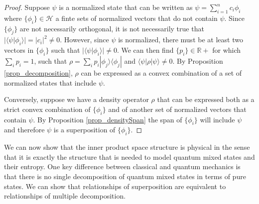 \documentclass[10pt,twocolumn, nofootinbib]{revtex4-2}
\def\>{\rangle}
\def\<{\langle}
\begin{document}
\begin{proof}
	Suppose $\psi$ is a normalized state that can be written as $\psi = \sum_{i=1}^n c_i \phi_i$ where $\{\phi_i\} \in \mathcal{H}$ a finte sets of normalized vectors that do not contain $\psi$. Since $\{\phi_j\}$ are not necessarily orthogonal, it is not necessarily true that $|\<\psi|\phi_i\>| = |c_i|^2 \neq 0$. However, since $\psi$ is normalized, there must be at least two vectors in $\{\phi_i\}$ such that $|\<\psi|\phi_i\>| \neq 0$. We can then find $\{p_i\} \in \mathbb{R}+$ for which $\sum_i p_i =1$, such that $\rho = \sum_i p_i |\phi_j\>\<\phi_j|$ and $\<\psi|\rho|\psi\> \neq 0$. By Proposition \ref{prop_decomposition}, $\rho$ can be expressed as a convex combination of a set of normalized states that include $\psi$.
	
	Conversely, suppose we have a density operator $\rho$ that can be expressed both as a strict convex combination of $\{\phi_i\}$ and of another set of normalized vectors that contain $\psi$. By Proposition \ref{prop_densitySpan} the span of $\{\phi_i\}$ will include $\psi$ and therefore $\psi$ is a superposition of $\{\phi_i\}$.
\end{proof}

We can now show that the inner product space structure is physical in the sense that it is exactly the structure that is needed to model quantum mixed states and their entropy. One key difference between classical and quantum mechanics is that there is no single decomposition of quantum mixed states in terms of pure states. We can show that relationships of superposition are equivalent to relationships of multiple decomposition.
\end{document}
